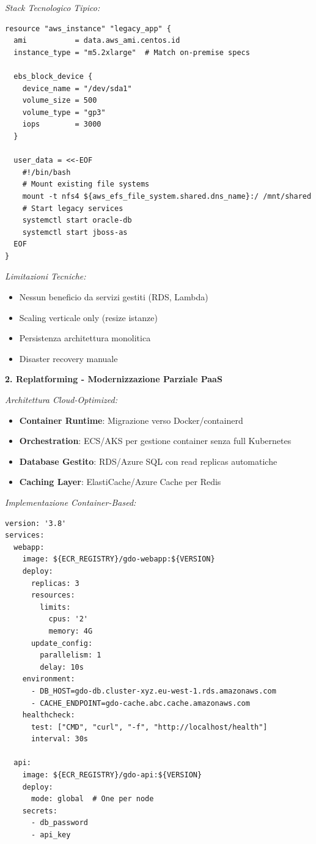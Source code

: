 \textit{Stack Tecnologico Tipico:}
\begin{lstlisting}[caption={Terraform per Lift-and-Shift},label={lst:lift_shift}]
resource "aws_instance" "legacy_app" {
  ami           = data.aws_ami.centos.id
  instance_type = "m5.2xlarge"  # Match on-premise specs
  
  ebs_block_device {
    device_name = "/dev/sda1"
    volume_size = 500
    volume_type = "gp3"
    iops        = 3000
  }
  
  user_data = <<-EOF
    #!/bin/bash
    # Mount existing file systems
    mount -t nfs4 ${aws_efs_file_system.shared.dns_name}:/ /mnt/shared
    # Start legacy services
    systemctl start oracle-db
    systemctl start jboss-as
  EOF
}
\end{lstlisting}

\textit{Limitazioni Tecniche:}
\begin{itemize}
    \item Nessun beneficio da servizi gestiti (RDS, Lambda)
    \item Scaling verticale only (resize istanze)
    \item Persistenza architettura monolitica
    \item Disaster recovery manuale
\end{itemize}

\textbf{2. Replatforming - Modernizzazione Parziale PaaS}

\textit{Architettura Cloud-Optimized:}
\begin{itemize}
    \item \textbf{Container Runtime}: Migrazione verso Docker/containerd
    \item \textbf{Orchestration}: ECS/AKS per gestione container senza full Kubernetes
    \item \textbf{Database Gestito}: RDS/Azure SQL con read replicas automatiche
    \item \textbf{Caching Layer}: ElastiCache/Azure Cache per Redis
\end{itemize}

\textit{Implementazione Container-Based:}
\begin{lstlisting}[caption={Docker Compose per Replatforming},label={lst:replatform}]
version: '3.8'
services:
  webapp:
    image: ${ECR_REGISTRY}/gdo-webapp:${VERSION}
    deploy:
      replicas: 3
      resources:
        limits:
          cpus: '2'
          memory: 4G
      update_config:
        parallelism: 1
        delay: 10s
    environment:
      - DB_HOST=gdo-db.cluster-xyz.eu-west-1.rds.amazonaws.com
      - CACHE_ENDPOINT=gdo-cache.abc.cache.amazonaws.com
    healthcheck:
      test: ["CMD", "curl", "-f", "http://localhost/health"]
      interval: 30s
      
  api:
    image: ${ECR_REGISTRY}/gdo-api:${VERSION}
    deploy:
      mode: global  # One per node
    secrets:
      - db_password
      - api_key
\end{lstlisting}

